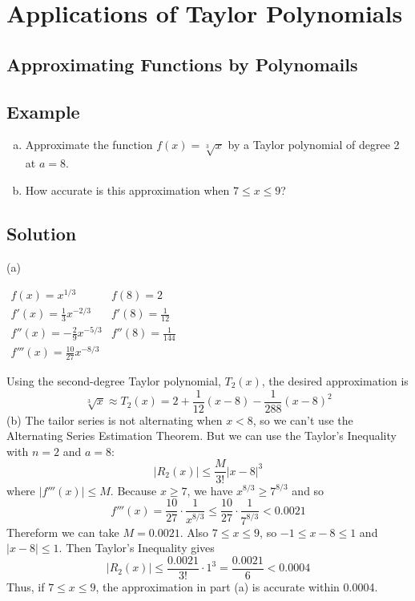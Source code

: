 \section{Applications of Taylor Polynomials}

\subsection*{Approximating Functions by Polynomails}

\subsection*{Example}
\begin{enumerate}[(a)]
    \item Approximate the function $f(x)=\sqrt[3]{x}$ by a Taylor
          polynomial of degree 2 at $a=8$.
    \item How accurate is this approximation when $7\leq x \leq 9$?
\end{enumerate}

\subsection*{Solution}
(a)
\begin{center}
    $\begin{array}{ll}
            f(x)=x^{1/3}                & f(8)=2               \\
            f'(x)=\frac{1}{3}x^{-2/3}   & f'(8)=\frac{1}{12}   \\
            f''(x)=-\frac{2}{9}x^{-5/3} & f''(8)=\frac{1}{144} \\
            f'''(x)=\frac{10}{27}x^{-8/3}
        \end{array}$
\end{center}
Using the second-degree Taylor polynomial, $T_2(x)$, the desired approximation is
$$ \sqrt[3]{x} \approx T_2(x) = 2+\frac{1}{12}(x-8)-\frac{1}{288}(x-8)^2 $$
(b) The tailor series is not alternating when $x<8$, so we can't use the Alternating
Series Estimation Theorem. But we can use the Taylor's Inequality with $n=2$ and $a=8$:
$$ |R_2(x)| \leq \frac{M}{3!}|x-8|^3 $$
where $|f'''(x)|\leq M$. Because $x \geq 7$, we have $x^{8/3} \geq 7^{8/3}$ and so
$$ f'''(x)=\frac{10}{27} \cdot \frac{1}{x^{8/3}} \leq \frac{10}{27} \cdot \frac{1}{7^{8/3}}<0.0021$$
Thereform we can take $M=0.0021$. Also $7\leq x\leq 9$, so $-1\leq x-8\leq 1$ and
$|x-8|\leq 1$. Then Taylor's Inequality gives
$$ |R_2(x)| \leq \frac{0.0021}{3!} \cdot 1^3=\frac{0.0021}{6} < 0.0004 $$
Thus, if $7\leq x\leq 9$, the approximation in part (a) is accurate within 0.0004.